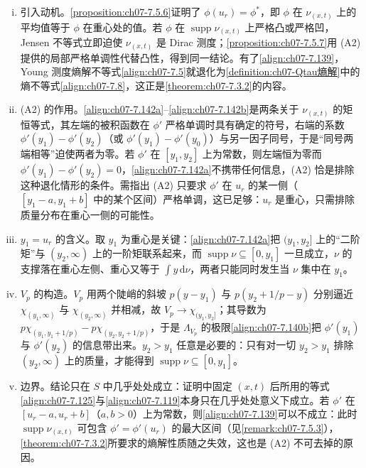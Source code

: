 \documentclass[../../main.tex]{subfiles}%
\begin{document}
\begin{remark}\label{remark:ch07-7.5.7动机}
\begin{enumerate}[(i)]
\item 引入动机。\cref{proposition:ch07-7.5.6}证明了 $\phi(u_r)=\phi^*$，即 $\phi$ 在 $\nu_{(x,t)}$ 上的平均值等于 $\phi$ 在重心处的值。若 $\phi$ 在 $\operatorname{supp}\nu_{(x,t)}$ 上严格凸或严格凹，Jensen 不等式立即迫使 $\nu_{(x,t)}$ 是 Dirac 测度；\cref{proposition:ch07-7.5.7}用 (A2) 提供的局部严格单调性代替凸性，得到同一结论。有了\eqref{align:ch07-7.139}，Young 测度熵解不等式\eqref{align:ch07-7.5}就退化为\cref{definition:ch07-Qtau熵解}中的熵不等式\eqref{align:ch07-7.8}，这正是\cref{theorem:ch07-7.3.2}的内容。
\item (A2) 的作用。\eqref{align:ch07-7.142a}--\eqref{align:ch07-7.142b}是两条关于 $\nu_{(x,t)}$ 的矩恒等式，其左端的被积函数在 $\phi'$ 严格单调时具有确定的符号，右端的系数 $\phi'(y_1)-\phi'(y_2)$（或 $\phi'(y_1)-\phi'(y_0)$）与另一因子同号，于是“同号两端相等”迫使两者为零。若 $\phi'$ 在 $[y_1,y_2]$ 上为常数，则左端恒为零而 $\phi'(y_1)-\phi'(y_2)=0$，\eqref{align:ch07-7.142a}不携带任何信息，(A2) 恰是排除这种退化情形的条件。需指出 (A2) 只要求 $\phi'$ 在 $u_r$ 的某一侧（$[y_1-a,y_1+b]$ 中的某个区间）严格单调，这已足够：$u_r$ 是重心，只需排除质量分布在重心一侧的可能性。
\item $y_1=u_r$ 的含义。取 $y_1$ 为重心是关键：\eqref{align:ch07-7.142a}把 $(y_1,y_2]$ 上的“二阶矩”与 $(y_2,\infty)$ 上的一阶矩联系起来，而 $\operatorname{supp}\nu\subseteq[0,y_1]$ 一旦成立，$\nu$ 的支撑落在重心左侧、重心又等于 $\int y\,\mathrm{d}\nu$，两者只能同时发生当 $\nu$ 集中在 $y_1$。
\item $V_p$ 的构造。$V_p$ 用两个陡峭的斜坡 $p(y-y_1)$ 与 $p(y_2+1/p-y)$ 分别逼近 $\chi_{(y_1,\infty)}$ 与 $\chi_{(y_2,\infty)}$ 并相减，故 $V_p\to\chi_{(y_1,y_2]}$；其导数为 $p\chi_{(y_1,y_1+1/p)}-p\chi_{(y_2,y_2+1/p)}$，于是 $\Lambda_{V_p}$ 的极限\eqref{align:ch07-7.140b}把 $\phi'(y_1)$ 与 $\phi'(y_2)$ 的信息带出来。$y_2>y_1$ 任意是必要的：只有对一切 $y_2>y_1$ 排除 $(y_2,\infty)$ 上的质量，才能得到 $\operatorname{supp}\nu\subseteq[0,y_1]$。
\item 边界。结论只在 $S$ 中几乎处处成立：证明中固定 $(x,t)$ 后所用的等式\eqref{align:ch07-7.125}与\eqref{align:ch07-7.119}本身只在几乎处处意义下成立。若 $\phi'$ 在 $[u_r-a,u_r+b]$（$a,b>0$）上为常数，则\eqref{align:ch07-7.139}可以不成立：此时 $\operatorname{supp}\nu_{(x,t)}$ 可包含 $\phi'=\phi'(u_r)$ 的最大区间（见\cref{remark:ch07-7.5.3}），\cref{theorem:ch07-7.3.2}所要求的熵解性质随之失效，这也是 (A2) 不可去掉的原因。
\end{enumerate}
\end{remark}
\end{document}
